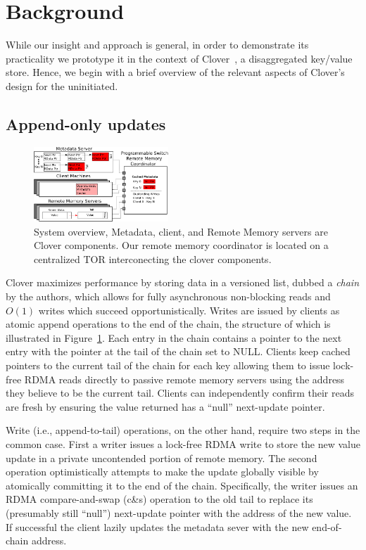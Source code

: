 \section{Background}

While our insight and approach is general, in order to demonstrate its
practicality we prototype it in the context of Clover~\cite{clover}, a
disaggregated key/value store.  Hence, we begin with a brief overview
of the relevant aspects of Clover's design for the uninitiated.

\subsection{Append-only updates}

\begin{figure}
    \includegraphics[width=0.45\textwidth]{fig/overview_2.png}
    \caption{ System overview, Metadata, client, and Remote Memory
    servers are Clover components. Our remote memory coordinator is
    located on a centralized TOR interconecting the clover components.
    }
    \label{fig:overview} 
\end{figure}

Clover maximizes performance by storing data in a versioned list, dubbed a
\emph{chain} by the authors, which allows for fully asynchronous non-blocking
reads and $O(1)$ writes which succeed opportunistically. Writes are issued by
clients as atomic append operations to the end of the chain, the structure of
which is illustrated in Figure~\ref{fig:overview}. Each entry in the chain
contains a pointer to the next entry with the pointer at the tail of the
chain set to NULL. Clients keep cached pointers to the current tail of the
chain for each key allowing them to issue lock-free RDMA reads directly to
passive remote memory servers using the address they believe to be the
current tail. Clients can independently confirm their reads are
fresh by ensuring the value returned has a ``null'' next-update pointer.

Write (i.e., append-to-tail) operations, on the other hand, require two steps
in the common case. First a writer issues a lock-free RDMA write to store the
new value update in a private uncontended portion of remote memory. The
second operation optimistically attempts to make the update globally visible
by atomically committing it to the end of the chain. Specifically, the writer
issues an RDMA compare-and-swap (c\&s) operation to the old tail to replace
its (presumably still ``null'') next-update pointer with the address of the
new value. If successful the client lazily updates the metadata sever with
the new end-of-chain address.

